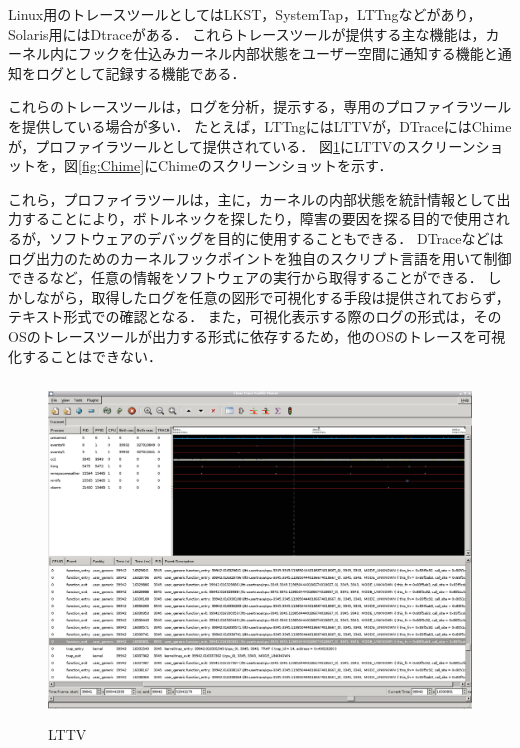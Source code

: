 Linux用のトレースツールとしてはLKST\cite{LKST}，SystemTap\cite{SystemTap}，LTTng\cite{LTTng}などがあり，Solaris用にはDtrace\cite{Dtrace}がある．
これらトレースツールが提供する主な機能は，カーネル内にフックを仕込みカーネル内部状態をユーザー空間に通知する機能と通知をログとして記録する機能である．

これらのトレースツールは，ログを分析，提示する，専用のプロファイラツールを提供している場合が多い．
たとえば，LTTngにはLTTV\cite{LTTV}が，DTraceにはChime\cite{Chime}が，プロファイラツールとして提供されている．
図\ref{fig:LTTV}にLTTVのスクリーンショットを，図\ref{fig:Chime}にChimeのスクリーンショットを示す．

これら，プロファイラツールは，主に，カーネルの内部状態を統計情報として出力することにより，ボトルネックを探したり，障害の要因を探る目的で使用されるが，ソフトウェアのデバッグを目的に使用することもできる．
DTraceなどはログ出力のためのカーネルフックポイントを独自のスクリプト言語を用いて制御できるなど，任意の情報をソフトウェアの実行から取得することができる．
しかしながら，取得したログを任意の図形で可視化する手段は提供されておらず，テキスト形式での確認となる．
また，可視化表示する際のログの形式は，そのOSのトレースツールが出力する形式に依存するため，他のOSのトレースを可視化することはできない．

\begin{figure}[p]
\begin{center}
\includegraphics[height=9cm]{img/LTTV.eps}
\caption{LTTV}
\label{fig:LTTV}
\end{center}
\end{figure}


